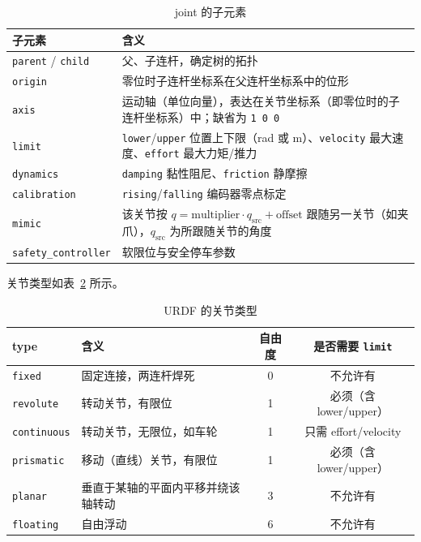 \begin{table}[H]
	\centering
	\caption{joint 的子元素}
	\label{tab:URDF:joint子元素}
	\begin{tabular}{lp{9.5cm}}
		\hline
		子元素 & 含义 \\
		\hline
		\texttt{parent} / \texttt{child} & 父、子连杆，确定树的拓扑 \\
		\texttt{origin} & 零位时子连杆坐标系在父连杆坐标系中的位形 \\
		\texttt{axis} & 运动轴（单位向量），表达在关节坐标系（即零位时的子连杆坐标系）中；缺省为 \texttt{1 0 0} \\
		\texttt{limit} & \texttt{lower}/\texttt{upper} 位置上下限（rad 或 m）、\texttt{velocity} 最大速度、\texttt{effort} 最大力矩/推力 \\
		\texttt{dynamics} & \texttt{damping} 黏性阻尼、\texttt{friction} 静摩擦 \\
		\texttt{calibration} & \texttt{rising}/\texttt{falling} 编码器零点标定 \\
		\texttt{mimic} & 该关节按 $q=\text{multiplier}\cdot q_{\text{src}}+\text{offset}$ 跟随另一关节（如夹爪），$q_{\text{src}}$ 为所跟随关节的角度 \\
		\texttt{safety\_controller} & 软限位与安全停车参数 \\
		\hline
	\end{tabular}
\end{table}

关节类型如表~\ref{tab:URDF:关节类型} 所示。

\begin{table}[H]
	\centering
	\caption{URDF 的关节类型}
	\label{tab:URDF:关节类型}
	\footnotesize
	\begin{tabular}{llcc}
		\hline
		type & 含义 & 自由度 & 是否需要 \texttt{limit} \\
		\hline
		\texttt{fixed} & 固定连接，两连杆焊死 & 0 & 不允许有 \\
		\texttt{revolute} & 转动关节，有限位 & 1 & 必须（含 lower/upper） \\
		\texttt{continuous} & 转动关节，无限位，如车轮 & 1 & 只需 effort/velocity \\
		\texttt{prismatic} & 移动（直线）关节，有限位 & 1 & 必须（含 lower/upper） \\
		\texttt{planar} & 垂直于某轴的平面内平移并绕该轴转动 & 3 & 不允许有 \\
		\texttt{floating} & 自由浮动 & 6 & 不允许有 \\
		\hline
	\end{tabular}
\end{table}

